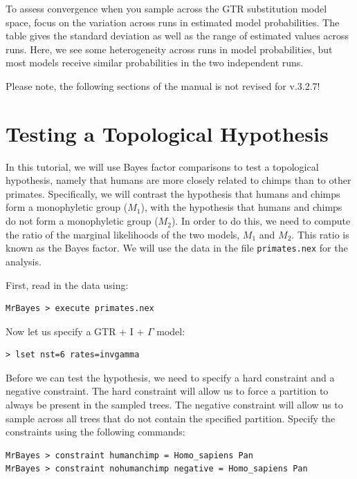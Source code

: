\documentclass[12pt]{book}
\newcommand{\ttt}[1]{\texttt{#1}}
\begin{document}
To assess convergence when you sample across the GTR substitution model space, focus on the
variation across runs in estimated model probabilities. The table gives the standard deviation as
well as the range of estimated values across runs. Here, we see some heterogeneity across runs in
model probabilities, but most models receive similar probabilities in the two independent runs.

\vspace{10 pt}
{\LARGE\color{red} Please note, the following sections of the manual is not revised for v.3.2.7!}

\section{Testing a Topological Hypothesis}

In this tutorial, we will use Bayes factor comparisons to test a topological hypothesis, namely
that humans are more closely related to chimps than to other primates. Specifically, we will
contrast the hypothesis that humans and chimps form a monophyletic group ($M_1$), with the
hypothesis that humans and chimps do not form a monophyletic group ($M_2$). In order to do this,
we need to compute the ratio of the marginal likelihoods of the two models, $M_1$ and $M_2$. This
ratio is known as the Bayes factor. We will use the data in the file \ttt{primates.nex} for the
analysis.

First, read in the data using:

\begin{verbatim}
MrBayes > execute primates.nex
\end{verbatim}

Now let us specify a GTR + I + $\Gamma$ model:

\begin{verbatim}
> lset nst=6 rates=invgamma
\end{verbatim}

Before we can test the hypothesis, we need to specify a hard constraint and a negative constraint.
The hard constraint will allow us to force a partition to always be present in the sampled trees.
The negative constraint will allow us to sample across all trees that do not contain the specified
partition. Specify the constraints using the following commands:

\begin{verbatim}
MrBayes > constraint humanchimp = Homo_sapiens Pan
MrBayes > constraint nohumanchimp negative = Homo_sapiens Pan
\end{verbatim}
\end{document}
